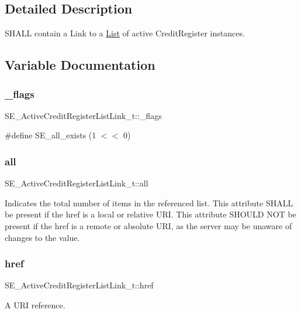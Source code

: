 \subsection{Detailed Description}
S\+H\+A\+LL contain a Link to a \hyperlink{structList}{List} of active Credit\+Register instances. 

\subsection{Variable Documentation}
\mbox{\label{group__ActiveCreditRegisterListLink_gaaf0b3c3b84c47e758967e5856f621999}} 
\subsubsection{\texorpdfstring{\+\_\+flags}{\_flags}}
{\footnotesize\ttfamily S\+E\+\_\+\+Active\+Credit\+Register\+List\+Link\+\_\+t\+::\+\_\+flags}

\#define S\+E\+\_\+all\+\_\+exists (1 $<$$<$ 0) \mbox{\label{group__ActiveCreditRegisterListLink_gaa7913b5cc1a4b61f153a9ee0ab97828c}} 
\subsubsection{\texorpdfstring{all}{all}}
{\footnotesize\ttfamily S\+E\+\_\+\+Active\+Credit\+Register\+List\+Link\+\_\+t\+::all}

Indicates the total number of items in the referenced list. This attribute S\+H\+A\+LL be present if the href is a local or relative U\+RI. This attribute S\+H\+O\+U\+LD N\+OT be present if the href is a remote or absolute U\+RI, as the server may be unaware of changes to the value. \mbox{\label{group__ActiveCreditRegisterListLink_gac685dc27ee8c52ebd780e40cf6d2590c}} 
\subsubsection{\texorpdfstring{href}{href}}
{\footnotesize\ttfamily S\+E\+\_\+\+Active\+Credit\+Register\+List\+Link\+\_\+t\+::href}

A U\+RI reference. 